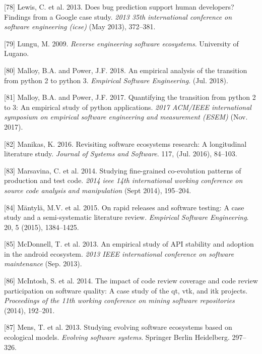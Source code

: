 \documentclass[]{book}
\begin{document}
\hypertarget{ref-Lewis2013}{}
{[}78{]} Lewis, C. et al. 2013. Does bug prediction support human
developers? Findings from a Google case study. \emph{2013 35th
international conference on software engineering (icse)} (May 2013),
372--381.

\hypertarget{ref-Lungu2009}{}
{[}79{]} Lungu, M. 2009. \emph{Reverse engineering software ecosystems}.
University of Lugano.

\hypertarget{ref-Malloy2018}{}
{[}80{]} Malloy, B.A. and Power, J.F. 2018. An empirical analysis of the
transition from python 2 to python 3. \emph{Empirical Software
Engineering}. (Jul. 2018).

\hypertarget{ref-Malloy2017}{}
{[}81{]} Malloy, B.A. and Power, J.F. 2017. Quantifying the transition
from python 2 to 3: An empirical study of python applications.
\emph{2017 ACM/IEEE international symposium on empirical software
engineering and measurement (ESEM)} (Nov. 2017).

\hypertarget{ref-Manikas2016}{}
{[}82{]} Manikas, K. 2016. Revisiting software ecosystems research: A
longitudinal literature study. \emph{Journal of Systems and Software}.
117, (Jul. 2016), 84--103.

\hypertarget{ref-marsavina2014}{}
{[}83{]} Marsavina, C. et al. 2014. Studying fine-grained co-evolution
patterns of production and test code. \emph{2014 ieee 14th international
working conference on source code analysis and manipulation} (Sept
2014), 195--204.

\hypertarget{ref-mantyla2015a}{}
{[}84{]} Mäntylä, M.V. et al. 2015. On rapid releases and software
testing: A case study and a semi-systematic literature review.
\emph{Empirical Software Engineering}. 20, 5 (2015), 1384--1425.

\hypertarget{ref-McDonnell2013}{}
{[}85{]} McDonnell, T. et al. 2013. An empirical study of API stability
and adoption in the android ecosystem. \emph{2013 IEEE international
conference on software maintenance} (Sep. 2013).

\hypertarget{ref-mcintosh2014impact}{}
{[}86{]} McIntosh, S. et al. 2014. The impact of code review coverage
and code review participation on software quality: A case study of the
qt, vtk, and itk projects. \emph{Proceedings of the 11th working
conference on mining software repositories} (2014), 192--201.

\hypertarget{ref-Mens2013}{}
{[}87{]} Mens, T. et al. 2013. Studying evolving software ecosystems
based on ecological models. \emph{Evolving software systems}. Springer
Berlin Heidelberg. 297--326.
\end{document}
